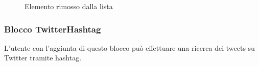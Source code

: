 \begin{itemize}
\begin{enumerate}
\begin{figure}[!ht]
		\caption{Elemento rimosso dalla lista}
		\end{figure}
	\end{enumerate}
\end{itemize}
\newpage
\subsubsection{Blocco TwitterHashtag} \label{twitterHa}
L'utente con l'aggiunta di questo blocco può effettuare una ricerca dei tweets su Twitter tramite hashtag.

